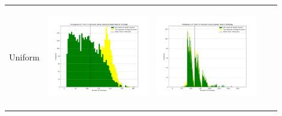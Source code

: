\begin{landscape}
\begin{table}[h!]
\begin{tabular}{ | c | c | c | c | c |}
    Uniform & \vline
    \begin{minipage}[c][45mm][c]{45mm}
      \includegraphics[width=44mm, height=44mm]{Chapters/MultiAgentTargetDetection/Figs/Histograms/VaryingPrior/Uniform/UniformEpsilonGreedyHistogram.png}
    \end{minipage}
    &
    \begin{minipage}[c][45mm][c]{45mm}
      \includegraphics[width=44mm, height=44mm]{Chapters/MultiAgentTargetDetection/Figs/Histograms/VaryingPrior/Uniform/UniformSweepHistogram.png}


\end{minipage}
\end{tabular}
\end{table}
\end{landscape}
